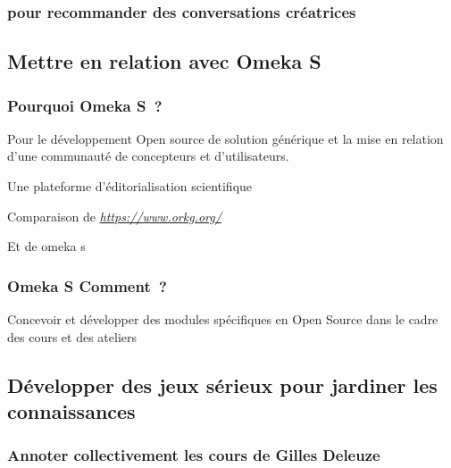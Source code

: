 \documentclass[
  letterpaper,
  DIV=11,
  numbers=noendperiod]{scrreprt}
\begin{document}
\hypertarget{pour-recommander-des-conversations-cruxe9atrices}{%
\subsubsection{pour recommander des conversations
créatrices}\label{pour-recommander-des-conversations-cruxe9atrices}}

\hypertarget{mettre-en-relation-avec-omeka-s}{%
\subsection{Mettre en relation avec Omeka
S}\label{mettre-en-relation-avec-omeka-s}}

\hypertarget{pourquoi-omeka-s}{%
\subsubsection{Pourquoi Omeka S~?}\label{pourquoi-omeka-s}}

Pour le développement Open source de solution générique et la mise en
relation d'une communauté de concepteurs et d'utilisateurs.

Une plateforme d'éditorialisation scientifique

Comparaison de
\href{https://www.orkg.org/}{\emph{https://www.orkg.org/}}

Et de omeka s

\hypertarget{omeka-s-comment}{%
\subsubsection{Omeka S Comment~?}\label{omeka-s-comment}}

Concevoir et développer des modules spécifiques en Open Source dans le
cadre des cours et des ateliers

\hypertarget{duxe9velopper-des-jeux-suxe9rieux-pour-jardiner-les-connaissances}{%
\subsection{Développer des jeux sérieux pour jardiner les
connaissances}\label{duxe9velopper-des-jeux-suxe9rieux-pour-jardiner-les-connaissances}}

\hypertarget{annoter-collectivement-les-cours-de-gilles-deleuze}{%
\subsubsection{Annoter collectivement les cours de Gilles
Deleuze}\label{annoter-collectivement-les-cours-de-gilles-deleuze}}
\end{document}
